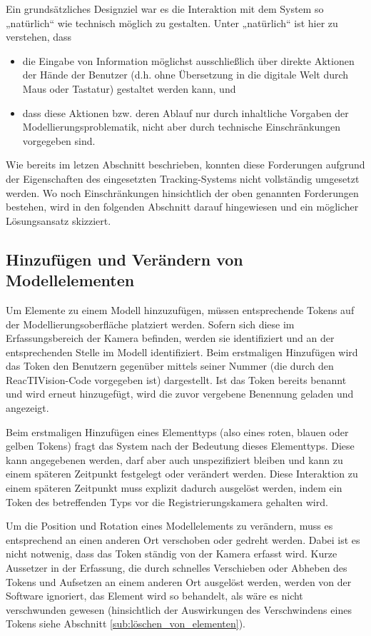 Ein grundsätzliches Designziel war es die Interaktion mit dem System so „natürlich“ wie technisch möglich zu gestalten. Unter „natürlich“ ist hier zu verstehen, dass 
\begin{itemize}
	\item die Eingabe von Information möglichst ausschließlich über direkte Aktionen der Hände der Benutzer (d.h. ohne Übersetzung in die digitale Welt durch Maus oder Tastatur) gestaltet werden kann, und
	\item dass diese Aktionen bzw. deren Ablauf nur durch inhaltliche Vorgaben der Modellierungsproblematik, nicht aber durch technische Einschränkungen vorgegeben sind.
\end{itemize}
Wie bereits im letzen Abschnitt beschrieben, konnten diese Forderungen aufgrund der Eigenschaften des eingesetzten Tracking-Systems nicht vollständig umgesetzt werden. Wo noch Einschränkungen hinsichtlich der oben genannten Forderungen bestehen, wird in den folgenden Abschnitt darauf hingewiesen und ein möglicher Lösungsansatz skizziert.

\subsection{Hinzufügen und Verändern von Modellelementen} %
\label{sub:hinzufügen_und_verändern_von_modellelementen}

Um Elemente zu einem Modell hinzuzufügen, müssen entsprechende Tokens auf der Modellierungsoberfläche platziert werden. Sofern sich diese im Erfassungsbereich der Kamera befinden, werden sie identifiziert und an der entsprechenden Stelle im Modell identifiziert. Beim erstmaligen Hinzufügen wird das Token den Benutzern gegenüber mittels seiner Nummer (die durch den ReacTIVision-Code vorgegeben ist) dargestellt. Ist das Token bereits benannt und wird erneut hinzugefügt, wird die zuvor vergebene Benennung geladen und angezeigt.

Beim erstmaligen Hinzufügen eines Elementtyps (also eines roten, blauen oder gelben Tokens) fragt das System nach der Bedeutung dieses Elementtyps. Diese kann angegebenen werden, darf aber auch unspezifiziert bleiben und kann zu einem späteren Zeitpunkt festgelegt oder verändert werden. Diese Interaktion zu einem späteren Zeitpunkt muss explizit dadurch ausgelöst werden, indem ein Token des betreffenden Typs vor die Registrierungskamera gehalten wird.

Um die Position und Rotation eines Modellelements zu verändern, muss es entsprechend an einen anderen Ort verschoben oder gedreht werden. Dabei ist es nicht notwenig, dass das Token ständig von der Kamera erfasst wird. Kurze Aussetzer in der Erfassung, die durch schnelles Verschieben oder Abheben des Tokens und Aufsetzen an einem anderen Ort ausgelöst werden, werden von der Software ignoriert, das Element wird so behandelt, als wäre es nicht verschwunden gewesen (hinsichtlich der Auswirkungen des Verschwindens eines Tokens siehe Abschnitt \ref{sub:löschen_von_elementen}).

